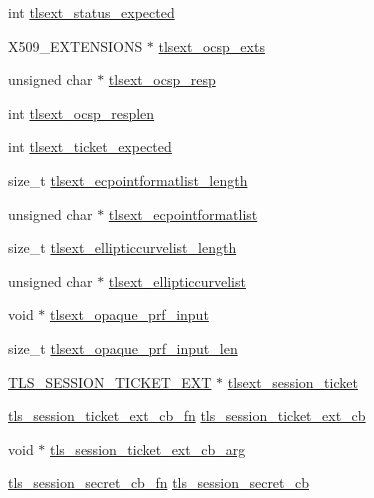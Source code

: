 \begin{DoxyCompactItemize}
int \hyperlink{structssl__st_a0a0d75de2cdedb99c07403d56aa9ae8c}{tlsext\-\_\-status\-\_\-expected}
\item 
X509\-\_\-\-E\-X\-T\-E\-N\-S\-I\-O\-N\-S $\ast$ \hyperlink{structssl__st_a234c465dc9c34dde4ac3cc24a79467a1}{tlsext\-\_\-ocsp\-\_\-exts}
\item 
unsigned char $\ast$ \hyperlink{structssl__st_ab54a13d08a8b115b2a7897c9213b1fb7}{tlsext\-\_\-ocsp\-\_\-resp}
\item 
int \hyperlink{structssl__st_a4a86cdf17eb779e0d6e467105103eb5f}{tlsext\-\_\-ocsp\-\_\-resplen}
\item 
int \hyperlink{structssl__st_ac3163b212ec333ebcfba794e683be1d2}{tlsext\-\_\-ticket\-\_\-expected}
\item 
size\-\_\-t \hyperlink{structssl__st_a1661bf580598984c531b321c0a005d37}{tlsext\-\_\-ecpointformatlist\-\_\-length}
\item 
unsigned char $\ast$ \hyperlink{structssl__st_a000e3639718d5d28e610cca71c0ee995}{tlsext\-\_\-ecpointformatlist}
\item 
size\-\_\-t \hyperlink{structssl__st_ac0a9a07be2d0e0f83b0844b61e82d06f}{tlsext\-\_\-ellipticcurvelist\-\_\-length}
\item 
unsigned char $\ast$ \hyperlink{structssl__st_af2e7ed3a280b3afb8d42ea9f9aa45637}{tlsext\-\_\-ellipticcurvelist}
\item 
void $\ast$ \hyperlink{structssl__st_a25e40e842200910b02ec2191da0f5f62}{tlsext\-\_\-opaque\-\_\-prf\-\_\-input}
\item 
size\-\_\-t \hyperlink{structssl__st_a83b5b006619d33cb3bd36b0b03288e9f}{tlsext\-\_\-opaque\-\_\-prf\-\_\-input\-\_\-len}
\item 
\hyperlink{ssl_8h_a6f21bcd57af48df2c3043423ec10f7d2}{T\-L\-S\-\_\-\-S\-E\-S\-S\-I\-O\-N\-\_\-\-T\-I\-C\-K\-E\-T\-\_\-\-E\-X\-T} $\ast$ \hyperlink{structssl__st_a88b1275f3d5733e3e856fe8c09d18566}{tlsext\-\_\-session\-\_\-ticket}
\item 
\hyperlink{ssl_8h_a6b72de02494811b454889904ec0f1a4f}{tls\-\_\-session\-\_\-ticket\-\_\-ext\-\_\-cb\-\_\-fn} \hyperlink{structssl__st_adfbd96d1abce945f541c432379fc994f}{tls\-\_\-session\-\_\-ticket\-\_\-ext\-\_\-cb}
\item 
void $\ast$ \hyperlink{structssl__st_a45dd63c101fc5b96773ab292285962a4}{tls\-\_\-session\-\_\-ticket\-\_\-ext\-\_\-cb\-\_\-arg}
\item 
\hyperlink{ssl_8h_ac44626654a7abe76044ae6f05a9b586e}{tls\-\_\-session\-\_\-secret\-\_\-cb\-\_\-fn} \hyperlink{structssl__st_aff0b13d0e1261db9771d7cf0e64cc5cc}{tls\-\_\-session\-\_\-secret\-\_\-cb}

\end{DoxyCompactItemize}
